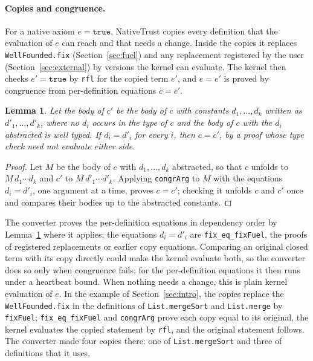 \documentclass[11pt]{article}
\newtheorem{lemma}{Lemma}
\begin{document}
\paragraph{Copies and congruence.} For a native axiom \(e = \mathtt{true}\), NativeTrust copies
every definition that the evaluation of \(e\) can reach and that needs a change. Inside the copies
it replaces \texttt{WellFounded.fix} (Section~\ref{sec:fuel}) and any replacement registered by
the user (Section~\ref{sec:external}) by versions the kernel can evaluate. The kernel then checks
\(e' = \mathtt{true}\) by \texttt{rfl} for the copied term \(e'\), and \(e = e'\) is proved by
congruence from per-definition equations \(c = c'\).

\begin{lemma}\label{lem:copy}
Let the body of \(c'\) be the body of \(c\) with constants \(d_1,\dots,d_k\) written as \(d'_1,\dots,d'_k\),
where no \(d_i\) occurs in the type of \(c\) and the body of \(c\) with the \(d_i\) abstracted is well typed. If
\(d_i = d'_i\) for every \(i\), then \(c = c'\), by a proof whose type check need not evaluate either side.
\end{lemma}
\begin{proof}
Let \(M\) be the body of \(c\) with \(d_1,\dots,d_k\) abstracted, so that \(c\) unfolds to \(M\,d_1\cdots d_k\)
and \(c'\) to \(M\,d'_1\cdots d'_k\). Applying \texttt{congrArg} to \(M\) with the equations \(d_i = d'_i\), one
argument at a time, proves \(c = c'\); checking it unfolds \(c\) and \(c'\) once and compares their bodies up to
the abstracted constants.
\end{proof}
The converter proves the per-definition equations in dependency order by Lemma~\ref{lem:copy} where it applies;
the equations
\(d_i = d'_i\) are \texttt{fix\_eq\_fixFuel}, the proofs of registered replacements or earlier copy equations. Comparing an original closed term with its copy
directly could make the kernel evaluate both, so the converter does so only when congruence fails;
for the per-definition equations it then runs under a heartbeat bound. When nothing needs a change, this is plain kernel evaluation of \(e\). In the example of
Section~\ref{sec:intro}, the copies replace the \texttt{WellFounded.fix} in the definitions of
\texttt{List.mergeSort} and \texttt{List.merge} by \texttt{fixFuel}; \texttt{fix\_eq\_fixFuel} and \texttt{congrArg} prove each copy equal
to its original, the kernel evaluates the copied statement by \texttt{rfl}, and the original statement follows.
The converter made four copies there: one of \texttt{List.mergeSort} and three of definitions that it uses.
\end{document}
